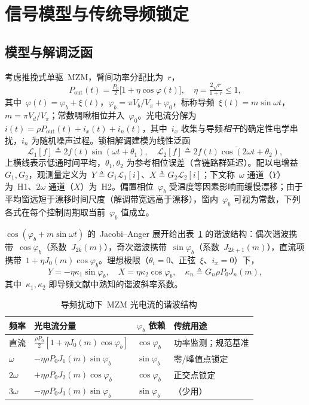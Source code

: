 \documentclass[11pt,journal,onecolumn]{IEEEtran}
\theoremstyle{plain}
\theoremstyle{remark}
\newcommand{\Lc}{\mathcal{L}}
\begin{document}
\section{信号模型与传统导频锁定}
\label{sec:model}

\subsection{模型与解调泛函}
考虑推挽式单驱~MZM，臂间功率分配比为~$r$，
\begin{equation}
P_{\mathrm{out}}(t)=\tfrac{P_0}{2}\bigl[1+\eta\cos\varphi(t)\bigr],\quad
\eta=\tfrac{2\sqrt r}{1+r}\le 1,
\label{eq:mzm}
\end{equation}
其中~$\varphi(t)=\varphi_b+\xi(t)$，$\varphi_b=\pi V_b/V_\pi+\varphi_0$，标称导频~$\xi(t)=m\sin\omega t$，$m=\pi V_d/V_\pi$；常数啁啾相位并入~$\varphi_0$。光电流分解为~$i(t)=\rho P_{\mathrm{out}}(t)+i_x(t)+i_n(t)$，其中~$i_x$ 收集与导频\emph{相干}的确定性电学串扰，$i_n$ 为随机噪声过程。锁相解调建模为线性泛函
\begin{equation}
\Lc_1[f]\!\triangleq\!\overline{2f(t)\sin(\omega t{+}\theta_1)},\quad
\Lc_2[f]\!\triangleq\!\overline{2f(t)\cos(2\omega t{+}\theta_2)},
\label{eq:lockin}
\end{equation}
上横线表示低通时间平均，$\theta_1,\theta_2$ 为参考相位误差（含链路群延迟）。配以电增益~$G_1,G_2$，观测量定义为~$Y\triangleq G_1\Lc_1[i]$、$X\triangleq G_2\Lc_2[i]$；下文称~$\omega$ 通道（$Y$）为~H1、$2\omega$ 通道（$X$）为~H2。偏置相位~$\varphi_b$ 受温度等因素影响而缓慢漂移；由于平均窗远短于漂移时间尺度（解调带宽远高于漂移），窗内~$\varphi_b$ 可视为常数，下列各式在每个控制周期取当前~$\varphi_b$ 值成立。

$\cos(\varphi_b+m\sin\omega t)$ 的~Jacobi--Anger 展开给出表~\ref{tab:harm} 的谐波结构：偶次谐波携带~$\cos\varphi_b$（系数~$J_{2k}(m)$），奇次谐波携带~$\sin\varphi_b$（系数~$J_{2k+1}(m)$），直流项携带~$1+\eta J_0(m)\cos\varphi_b$。理想极限（$\theta_i{=}0$、正弦~$\xi$、$i_x{=}0$）下，
\begin{equation}
Y=-\eta\kappa_1\sin\varphi_b,\quad X=\eta\kappa_2\cos\varphi_b,\quad
\kappa_n\triangleq G_n\rho P_0 J_n(m),
\label{eq:ideal}
\end{equation}
其中~$\kappa_1,\kappa_2$ 即导频文献中熟知的谐波斜率系数。

\begin{table}[!t]
\caption{导频扰动下~MZM 光电流的谐波结构}
\label{tab:harm}
\centering
\footnotesize
\begin{tabular}{llll}
\toprule
频率 & 光电流分量 & $\varphi_b$ 依赖 & 传统用途\\
\midrule
直流 & $\frac{\rho P_0}{2}[1{+}\eta J_0(m)\cos\varphi_b]$ & $\cos\varphi_b$ & 功率监测；规范基准\\
$\omega$ & $-\eta\rho P_0 J_1(m)\sin\varphi_b$ & $\sin\varphi_b$ & 零/峰值点锁定\\
$2\omega$ & $+\eta\rho P_0 J_2(m)\cos\varphi_b$ & $\cos\varphi_b$ & 正交点锁定\\
$3\omega$ & $-\eta\rho P_0 J_3(m)\sin\varphi_b$ & $\sin\varphi_b$ & （少用）\\
\bottomrule
\end{tabular}
\end{table}
\end{document}
